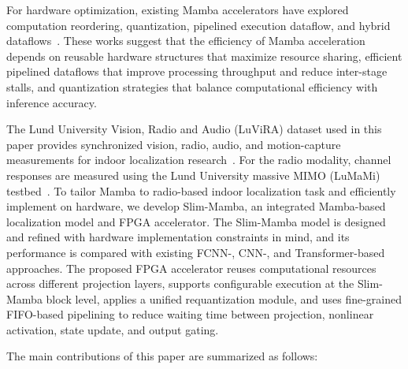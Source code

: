 \documentclass[lettersize,journal]{IEEEtran}
\begin{document}
For hardware optimization, existing Mamba accelerators have explored computation reordering, quantization, pipelined execution dataflow, and hybrid dataflows~\cite{LightMamba2025,FastMamba2025,HCSA2025,MARCA2024}. These works suggest that the efficiency of Mamba acceleration depends on reusable hardware structures that maximize resource sharing, efficient pipelined dataflows that improve processing throughput and reduce inter-stage stalls, and quantization strategies that balance computational efficiency with inference accuracy. 

The Lund University Vision, Radio and Audio (LuViRA) dataset used in this paper provides synchronized vision, radio, audio, and motion-capture measurements for indoor localization research~\cite{LuViRA2024,LuViRAValidation2024}. For the radio modality, channel responses are measured using the Lund University massive MIMO (LuMaMi) testbed~\cite{LuMaMi2017}.
To tailor Mamba to radio-based indoor localization task and efficiently implement on hardware, we develop Slim-Mamba, an integrated Mamba-based localization model and FPGA accelerator. The Slim-Mamba model is designed and refined with hardware implementation constraints in mind, and its performance is compared with existing FCNN-, CNN-, and Transformer-based approaches. 
The proposed FPGA accelerator reuses computational resources across different projection layers, supports configurable execution at the Slim-Mamba block level, applies a unified requantization module, and uses fine-grained FIFO-based pipelining to reduce waiting time between projection, nonlinear activation, state update, and output gating.

The main contributions of this paper are summarized as follows:
\end{document}
